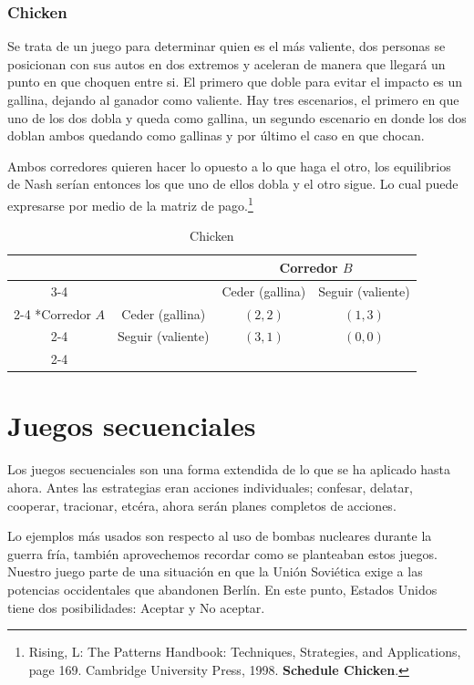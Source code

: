 \subsubsection*{Chicken}

Se trata de un juego para determinar quien es el más valiente, dos personas se posicionan con sus autos en dos extremos y aceleran de manera que llegará un punto en que choquen entre si. El primero que doble para evitar el impacto es un gallina, dejando al ganador como valiente. Hay tres escenarios, el primero en que uno de los dos dobla y queda como gallina, un segundo escenario en donde los dos doblan ambos quedando como gallinas y por último el caso en que chocan. 

Ambos corredores quieren hacer lo opuesto a lo que haga el otro, los equilibrios de Nash serían entonces los que uno de ellos dobla y el otro sigue. Lo cual puede expresarse por medio de la matriz de pago.\footnote{Rising, L: The Patterns Handbook: Techniques, Strategies, and Applications, page 169. Cambridge University Press, 1998. \textbf{Schedule Chicken}.}
\begin{table}[!htbp]
    \centering 
    \caption{Chicken}
    \setlength{\extrarowheight}{2pt}
    \begin{tabular}{*{4}{c|}}
      \multicolumn{2}{c}{} & \multicolumn{2}{c}{Corredor $B$}\\\cline{3-4}
      \multicolumn{1}{c}{} &  & Ceder (gallina)  & Seguir (valiente) \\\cline{2-4}
      \multirow{2}*{Corredor $A$}  & Ceder (gallina) & $(2,2)$ & $(1,3)$ \\\cline{2-4}
      & Seguir (valiente) & $(3,1)$ & $(0,0)$ \\\cline{2-4}
    \end{tabular}
  \end{table}

\section{Juegos secuenciales}

Los juegos secuenciales son una forma extendida de lo que se ha aplicado hasta ahora. Antes las estrategias eran acciones individuales; confesar, delatar, cooperar, tracionar, etcéra, ahora serán planes completos de acciones. 

Lo ejemplos más usados son respecto al uso de bombas nucleares durante la guerra fría, también aprovechemos recordar como se planteaban estos juegos. Nuestro juego parte de una situación en que la Unión Soviética exige a las potencias
occidentales que abandonen Berlín. En este punto, Estados Unidos tiene dos posibilidades:
Aceptar y No aceptar.

